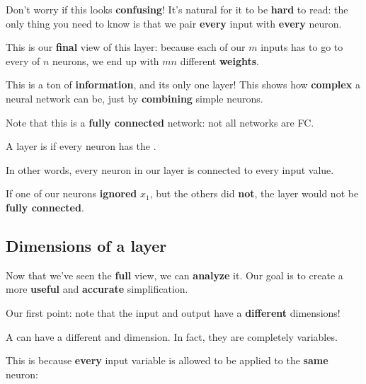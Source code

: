         Don't worry if this looks \textbf{confusing}! It's natural for it to be \textbf{hard} to read: the only thing you need to know is that we pair \textbf{every} input with \textbf{every} neuron.
        
        This is our \textbf{final} view of this layer: because each of our $m$ inputs has to go to every of $n$ neurons, we end up with $mn$ different \textbf{weights}.
        
        This is a ton of \textbf{information}, and its only one layer! This shows how \textbf{complex} a neural network can be, just by \textbf{combining} simple neurons.
        
        Note that this is a \textbf{fully connected} network: not all networks are FC.\\
        
        \begin{definition}
            A layer is  if every neuron has the .

            In other words, every neuron in our layer is connected to every input value.
        \end{definition}
        
        \miniex If one of our neurons \textbf{ignored} $x_1$, but the others did \textbf{not}, the layer would not be \textbf{fully connected}.
        
    \subsection{Dimensions of a layer}
    
        Now that we've seen the \textbf{full} view, we can \textbf{analyze} it. Our goal is to create a more \textbf{useful} and \textbf{accurate} simplification.
        
        Our first point: note that the input and output have a \textbf{different} dimensions!\\
        
        \begin{clarification}
            A  can have a different  and  dimension. In fact, they are completely  variables.
        \end{clarification}
        
        This is because \textbf{every} input variable is allowed to be applied to the \textbf{same} neuron: 
            
